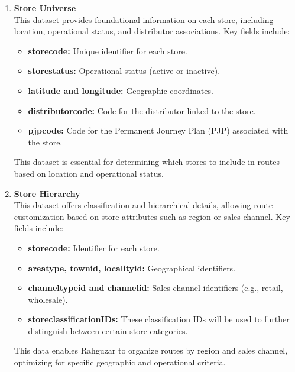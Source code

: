 \begin{enumerate}

\item \textbf{Store Universe} \\
This dataset provides foundational information on each store, including location, operational status, and distributor associations. Key fields include:
    \begin{itemize}
        \item \textbf{storecode:} Unique identifier for each store.
        \item \textbf{storestatus:} Operational status (active or inactive).
        \item \textbf{latitude and longitude:} Geographic coordinates.
        \item \textbf{distributorcode:} Code for the distributor linked to the store.
        \item \textbf{pjpcode:} Code for the Permanent Journey Plan (PJP) associated with the store.
    \end{itemize}
This dataset is essential for determining which stores to include in routes based on location and operational status.

\item \textbf{Store Hierarchy} \\
This dataset offers classification and hierarchical details, allowing route customization based on store attributes such as region or sales channel. Key fields include:
    \begin{itemize}
        \item \textbf{storecode:} Identifier for each store.
        \item \textbf{areatype, townid, localityid:} Geographical identifiers.
        \item \textbf{channeltypeid and channelid:} Sales channel identifiers (e.g., retail, wholesale).
        \item \textbf{storeclassificationIDs: } These classification IDs will be used to further distinguish between certain store categories.
    \end{itemize}
This data enables Rahguzar to organize routes by region and sales channel, optimizing for specific geographic and operational criteria.


\end{enumerate}
